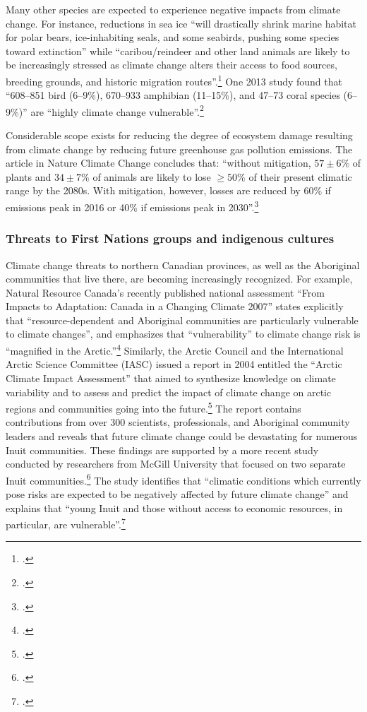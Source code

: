 Many other species are expected to experience negative impacts from climate change.
For instance, reductions in sea ice ``will drastically shrink marine habitat for polar bears, ice-inhabiting seals, and some seabirds, pushing some species toward extinction'' while ``caribou/reindeer and other land animals are likely to be increasingly stressed as climate change alters their access to food sources, breeding grounds, and historic migration routes''.\footcite[][Executive summary, p. 10]{ACIA2004}
One 2013 study found that ``608–851 bird (6–9\%), 670–933 amphibian (11–15\%), and 47–73 coral species (6–9\%)'' are ``highly climate change vulnerable''.\footcite[][p. 1]{VulnerableSpecies}


Considerable scope exists for reducing the degree of ecosystem damage resulting from climate change by reducing future greenhouse gas pollution emissions.
The article in Nature Climate Change concludes that: ``without mitigation, $57 \pm 6\%$ of plants and $34 \pm 7\%$ of animals are likely to lose $\ge 50\%$ of their present climatic range by the 2080s. With mitigation, however, losses are reduced by 60\% if emissions peak in 2016 or 40\% if emissions peak in 2030''.\footcite[][]{WarrenBiodiversity}



	\subsubsection{Threats to First Nations groups and indigenous cultures}



Climate change threats to northern Canadian provinces, as well as the Aboriginal communities that live there, are becoming increasingly recognized. 
For example, Natural Resource Canada's recently published national assessment ``From Impacts to Adaptation: Canada in a Changing Climate 2007'' states explicitly that ``resource-dependent and Aboriginal communities are particularly vulnerable to climate changes'', and emphasizes that ``vulnerability'' to climate change risk is ``magnified in the Arctic.''\footcite[][p.3, p. 14]{ImpToAda} 
Similarly, the Arctic Council and the International Arctic Science Committee (IASC) issued a report in 2004 entitled the ``Arctic Climate Impact Assessment'' that aimed  to synthesize knowledge on climate variability and to assess and predict the impact of climate change on arctic regions and communities going into the future.\footcite[][]{ACIA2004}
The report contains contributions from over 300 scientists, professionals, and Aboriginal community leaders and reveals that future climate change could be devastating for numerous Inuit communities.
These findings are supported by a more recent study conducted by researchers from McGill University that focused on two separate Inuit communities.\footcite[][]{CCInuitCommunities}
The study identifies that ``climatic conditions which currently pose risks are expected to be negatively affected by future climate change'' and explains that ``young Inuit and those without access to economic resources, in particular, are vulnerable''.\footcite[][p. 45, p. 54]{CCInuitCommunities}



